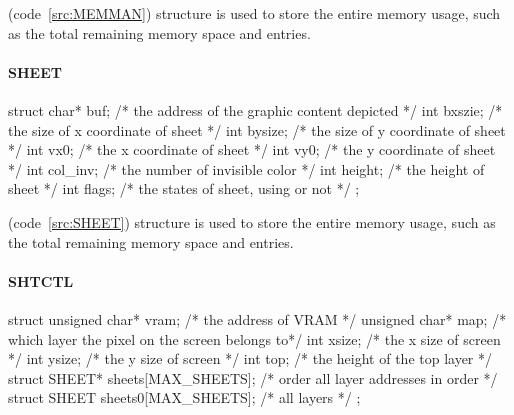 \documentclass{swfcthesis}
\begin{document}
(code~\ref{src:MEMMAN}) structure is used to store the entire memory usage, such as the total
remaining memory space and entries.



\paragraph{SHEET}

\begin{listing}[H]
  \begin{codeblock}
\begin{ccode}
struct 
{ 
  char* buf;   /* the address of the graphic content depicted */
  int bxszie;  /* the size of x coordinate of sheet */
  int bysize;  /* the size of y coordinate of sheet */
  int vx0;     /* the x coordinate of sheet */
  int vy0;     /* the y coordinate of sheet */
  int col_inv; /* the number of invisible color */
  int height;  /* the height of sheet */
  int flags;   /* the states of sheet, using or not */
};
\end{ccode}
  \end{codeblock}
  \caption{\emph{struct SHEET}}\label{src:SHEET}
\end{listing}

(code~\ref{src:SHEET}) structure is used to store the entire memory usage, such as the
total remaining memory space and entries.



\paragraph{SHTCTL}

\begin{listing}[H]
  \begin{codeblock}
\begin{ccode}
struct 
{ 
  unsigned char* vram;              /* the address of VRAM */
  unsigned char* map;               /* which layer the pixel on the screen belongs to*/
  int xsize;                        /* the x size of screen */
  int ysize;                        /* the y size of screen */
  int top;                          /* the height of the top layer */
  struct SHEET* sheets[MAX_SHEETS]; /* order all layer addresses in order */
  struct SHEET sheets0[MAX_SHEETS]; /* all layers */
};
\end{ccode}
  \end{codeblock}
  \caption{\emph{struct SHTCTL}}\label{src:SHTCTL}
\end{listing}
\end{document}
